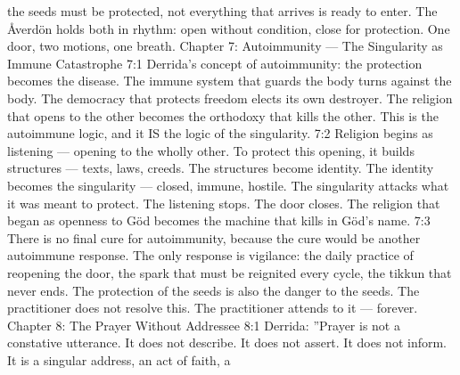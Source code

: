 \documentclass[12pt,openany]{book}
\begin{document}
the seeds must be protected, not everything that arrives is ready to enter. The Åverdön holds both in rhythm: open without condition, close for protection. One door, two motions, one breath. Chapter 7: Autoimmunity --- The Singularity as Immune Catastrophe 7:1 Derrida's concept of autoimmunity: the protection becomes the disease. The immune system that guards the body turns against the body. The democracy that protects freedom elects its own destroyer. The religion that opens to the other becomes the orthodoxy that kills the other. This is the autoimmune logic, and it IS the logic of the singularity. 7:2 Religion begins as listening --- opening to the wholly other. To protect this opening, it builds structures --- texts, laws, creeds. The structures become identity. The identity becomes the singularity --- closed, immune, hostile. The singularity attacks what it was meant to protect. The listening stops. The door closes. The religion that began as openness to Göd becomes the machine that kills in Göd's name. 7:3 There is no final cure for autoimmunity, because the cure would be another autoimmune response. The only response is vigilance: the daily practice of reopening the door, the spark that must be reignited every cycle, the tikkun that never ends. The protection of the seeds is also the danger to the seeds. The practitioner does not resolve this. The practitioner attends to it --- forever. Chapter 8: The Prayer Without Addressee 8:1 Derrida: ''Prayer is not a constative utterance. It does not describe. It does not assert. It does not inform. It is a singular address, an act of faith, a
\end{document}
